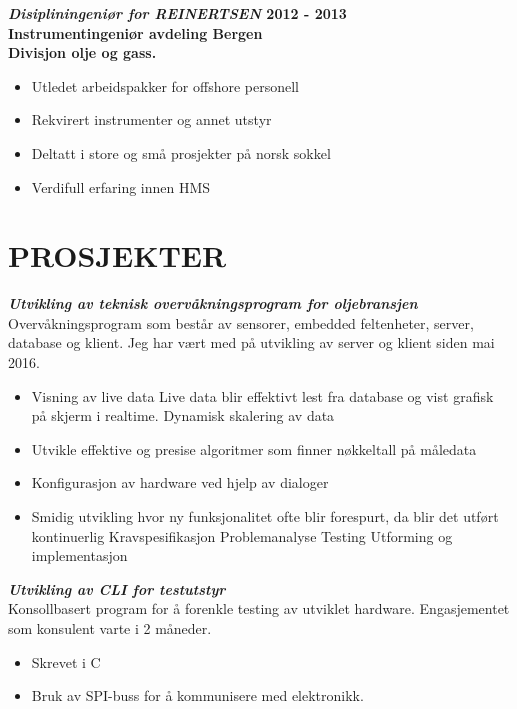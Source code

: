 \documentclass[margin, 10pt, norsk]{res} %
\begin{document}
\begin{resume}
\newpage

\textbf{\emph{Disipliningeniør for REINERTSEN} \hfill 2012 - 2013 \\
Instrumentingeniør avdeling Bergen\\
Divisjon olje og gass.}
\begin{itemize} \itemsep -2pt %
\item Utledet arbeidspakker for offshore personell 
\item Rekvirert instrumenter og annet utstyr
\item Deltatt i store og små prosjekter på norsk sokkel
\item Verdifull erfaring innen HMS
\end{itemize}

\hspace{5mm} 

\section{PROSJEKTER}

\textbf{\emph{Utvikling av teknisk overvåkningsprogram for oljebransjen}}\\
Overvåkningsprogram som består av sensorer, embedded feltenheter, server, database og klient. Jeg har vært med på utvikling av server og klient siden mai 2016. 
\begin{itemize}\itemsep -2pt   %
\item  Visning av live data
\subitem Live data blir effektivt lest fra database og vist grafisk på skjerm i realtime. 
\subitem Dynamisk skalering av data
\item Utvikle effektive og presise algoritmer som finner nøkkeltall på måledata
\item Konfigurasjon av hardware ved hjelp av dialoger
\item Smidig utvikling hvor ny funksjonalitet ofte blir forespurt, da blir det utført kontinuerlig
\subitem Kravspesifikasjon
\subitem Problemanalyse 
\subitem Testing
\subitem Utforming og implementasjon
\end{itemize}

\textbf{\emph{Utvikling av CLI for testutstyr}}\\
Konsollbasert program for å forenkle testing av utviklet hardware. Engasjementet som konsulent varte i 2 måneder. 
\begin{itemize}\itemsep -2pt   %
\item  Skrevet i C
\item Bruk av SPI-buss for å kommunisere med elektronikk.
\end{itemize}


\end{resume}
\end{document}
